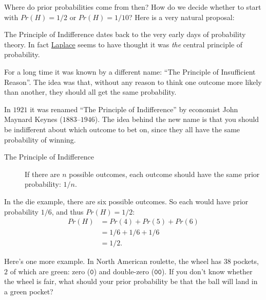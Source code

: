 \documentclass[justified]{tufte-book}
\newcommand{\pr}{Pr}
\theoremstyle{definition}
\theoremstyle{definition}
\theoremstyle{definition}
\theoremstyle{remark}
\begin{document}
Where do prior probabilities come from then? How do we decide whether to
start with \(\pr(H) = 1/2\) or \(\pr(H) = 1/10\)? Here is a very natural
proposal:

\begin{marginfigure}
The Principle of Indifference dates back to the very early days of
probability theory. In fact \protect\hyperlink{fig:laplace}{Laplace}
seems to have thought it was \emph{the} central principle of
probability.

For a long time it was known by a different name: ``The Principle of
Insufficient Reason''. The idea was that, without any reason to think
one outcome more likely than another, they should all get the same
probability.

In \(1921\) it was renamed ``The Principle of Indifference'' by
economist John Maynard Keynes (\(1883\)--\(1946\)). The idea behind the
new name is that you should be indifferent about which outcome to bet
on, since they all have the same probability of winning.
\end{marginfigure}

\begin{description}
\item[The Principle of Indifference]
If there are \(n\) possible outcomes, each outcome should have the same
prior probability: \(1/n\).
\end{description}

In the die example, there are six possible outcomes. So each would have
prior probability \(1/6\), and thus \(\pr(H) = 1/2\): \[
  \begin{aligned}
    \pr(H) &= \pr(4) + \pr(5) + \pr(6)\\
          &= 1/6 + 1/6 + 1/6\\
          &= 1/2.
  \end{aligned}
\]

Here's one more example. In North American roulette, the wheel has
\(38\) pockets, \(2\) of which are green: zero (\(\mathtt{0}\)) and
double-zero (\(\mathtt{00}\)). If you don't know whether the wheel is
fair, what should your prior probability be that the ball will land in a
green pocket?
\end{document}
